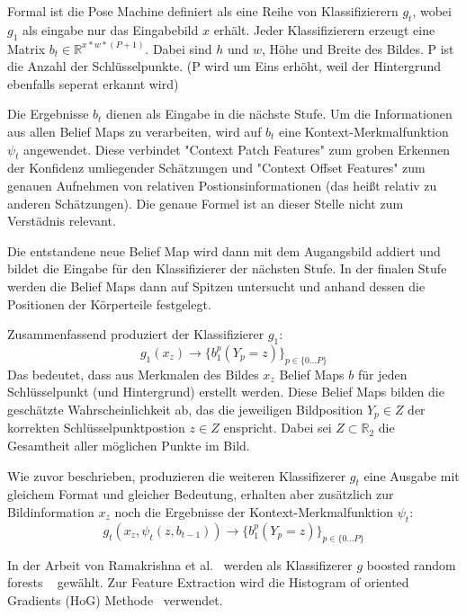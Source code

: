 \documentclass[journal, a4paper]{IEEEtran}
\begin{document}
        Formal ist die Pose Machine definiert als eine Reihe von Klassifizierern $g_t$, wobei $g_1$ als eingabe nur das Eingabebild $x$ erhält. Jeder Klassifizierern erzeugt eine Matrix $b_{t}\in\mathbb{R}^{x*w*(P+1)}$. Dabei sind $h$ und $w$, Höhe und Breite des Bildes. P ist die Anzahl der Schlüsselpunkte. (P wird um Eins erhöht, weil der Hintergrund ebenfalls seperat erkannt wird)

        Die Ergebnisse $b_t$ dienen als Eingabe in die nächste Stufe. 
        Um die Informationen aus allen Belief Maps zu verarbeiten, wird auf $b_t$ eine Kontext-Merkmalfunktion $\psi_t$ angewendet. Diese verbindet "Context Patch Features" zum groben Erkennen der Konfidenz umliegender Schätzungen und "Context Offset Features" zum genauen Aufnehmen von relativen Postionsinformationen (das heißt relativ zu anderen Schätzungen). Die genaue Formel ist an dieser Stelle nicht zum Verstädnis relevant. %

        Die entstandene neue Belief Map wird dann mit dem Augangsbild addiert und bildet die Eingabe für den Klassifizierer der nächsten Stufe. In der finalen Stufe werden die Belief Maps dann auf Spitzen untersucht und anhand dessen die Positionen der Körperteile festgelegt.

        Zusammenfassend produziert der Klassifizierer $g_1$:
        \[ g_1(x_z) \rightarrow \{b_{1}^{p}(Y_p = z) \}_{p \in \{0 \ldots P\}} \] 
        Das bedeutet, dass aus Merkmalen des Bildes $x_z$ Belief Maps $b$ für jeden Schlüsselpunkt (und Hintergrund) erstellt werden. Diese Belief Maps bilden die geschätzte Wahrscheinlichkeit ab, das die jeweiligen Bildposition $Y_p \in Z$ der korrekten Schlüsselpunktpostion $z \in Z$ enspricht. Dabei sei $Z \subset \mathbb{R}_2$ die Gesamtheit aller möglichen Punkte im Bild.

        Wie zuvor beschrieben, produzieren die weiteren Klassifizerer $g_t$ eine Ausgabe mit gleichem Format und gleicher Bedeutung, erhalten aber zusätzlich zur Bildinformation $x_z$ noch die Ergebnisse der Kontext-Merkmalfunktion $\psi_t$:
        \[ g_t(x_z,\psi_t(z,b_{t-1})) \rightarrow \{b_{1}^{p}(Y_p = z) \}_{p \in \{0 \ldots P\}} \] 

        In der Arbeit von Ramakrishna et al.~\cite{ramakrishna2014pose} werden als Klassifizerer $g$ boosted random forests ~\cite{breiman2001,friedman2001greedy} gewählt. Zur Feature Extraction wird die Histogram of oriented Gradients (HoG) Methode~\cite{dalal2005histograms} verwendet.
\end{document}
